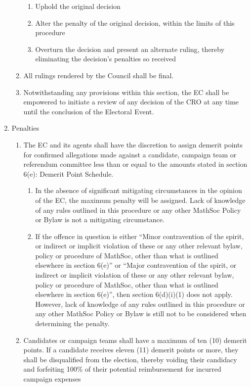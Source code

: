 \begin{enumerate}
\begin{enumerate}
        \begin{enumerate}
            \item Uphold the original decision
            \item Alter the penalty of the original decision, within the limits of this procedure
            \item Overturn the decision and present an alternate ruling, thereby eliminating the decision’s penalties so received
        \end{enumerate}
        \item All rulings rendered by the Council shall be final.
        \item Notwithstanding any provisions within this section, the EC shall be empowered to initiate a review of any decision of the CRO at any time until the conclusion of the Electoral Event.
    \end{enumerate}
    \item Penalties
    \begin{enumerate}
        \item The EC and its agents shall have the discretion to assign demerit points for confirmed allegations made against a candidate, campaign team or referendum committee less than or equal to the amounts stated in section 6(e): Demerit Point Schedule. 
        \begin{enumerate}
            \item In the absence of significant mitigating circumstances in the opinion of the EC, the maximum penalty will be assigned. Lack of knowledge of any rules outlined in this procedure or any other MathSoc Policy or Bylaw is not a mitigating circumstance.
            \item If the offence in question is either “Minor contravention of the spirit, or indirect or implicit violation of these or any other relevant bylaw, policy or procedure of MathSoc, other than what is outlined elsewhere in section 6(e)” or “Major contravention of the spirit, or indirect or implicit violation of these or any other relevant bylaw, policy or procedure of MathSoc, other than what is outlined elsewhere in section 6(e)”, then section 6(d)(i)(1) does not apply. However, lack of knowledge of any rules outlined in this procedure or any other MathSoc Policy or Bylaw is still not to be considered when determining the penalty.
        \end{enumerate}
        \item Candidates or campaign teams shall have a maximum of ten (10) demerit points. If a candidate receives eleven (11) demerit points or more, they shall be disqualified from the election, thereby voiding their candidacy and forfeiting 100\% of their potential reimbursement for incurred campaign expenses

\end{enumerate}
\end{enumerate}
